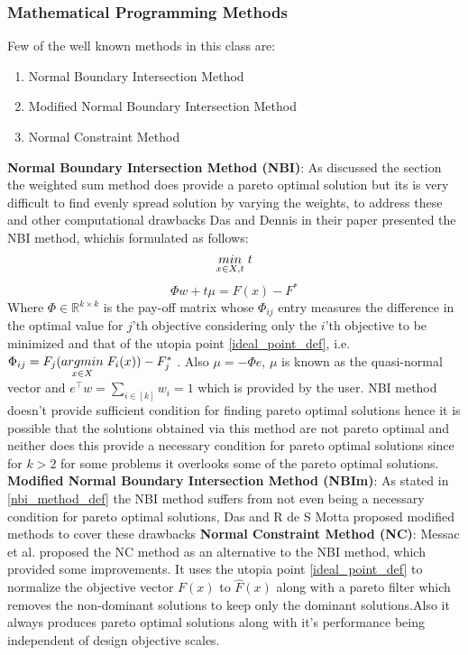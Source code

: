 \subsubsection{Mathematical Programming Methods}
Few of the well known methods in this class are:
\begin{enumerate}
    \item Normal Boundary Intersection Method
    \item Modified Normal Boundary Intersection Method
    \item Normal Constraint Method
\end{enumerate} 
\textbf{Normal Boundary Intersection Method (NBI)}: \label{nbi_method_def}
As discussed the section \label{lin_utility_model} the weighted sum method does provide a pareto optimal solution but its is very difficult to find evenly spread solution by varying the weights, to address these and other computational drawbacks Das and Dennis in their paper \cite{das1998normal} presented the NBI method, whichis formulated as follows:
\begin{equation} \label{nbi_obj}
    \underset{x\in X, t}{min} \hspace{1mm} t
\end{equation}
\begin{equation}
    \Phi w + t \mu = F(x) - F^{*}
\end{equation}
Where $\Phi \in \mathbb{R}^{k\times k}$ is the pay-off matrix whose $\Phi_{ij}$ entry measures the difference in the optimal value for $j$'th objective considering only the $i$'th objective to be minimized and that of the utopia point \ref{ideal_point_def}, i.e. $\Phi_{ij} = F_j(\underset{x\in X}{argmin}\hspace{1mm} F_i(x))-F^{*}_j$ . Also $\mu = - \Phi e$, $\mu$ is known as the quasi-normal vector and $e^{\top}w=\sum_{i\in [k]} w_i = 1$ which is provided by the user. NBI method doesn't provide sufficient condition for finding pareto optimal solutions hence it is possible that the solutions obtained via this method are not pareto optimal and neither does this provide a necessary condition for pareto optimal solutions since for $k>2$ for some problems it overlooks some of the pareto optimal solutions.
\newline\newline \textbf{Modified Normal Boundary Intersection Method (NBIm)}: \label{nbim_method_def} As stated in \ref{nbi_method_def} the NBI method suffers from not even being a necessary condition for pareto optimal solutions, Das \cite{das1999improved} and R de S Motta \cite{de2012modified} proposed modified methods to cover these drawbacks
\newline\newline \textbf{Normal Constraint Method (NC)}: \label{nc_method_def} Messac et al. \cite{messac2003normalized}\cite{messac2004normal} proposed the NC method as an alternative to the NBI method, which provided some improvements. It uses the utopia point \ref{ideal_point_def} to normalize the objective vector $F(x)$ to $\hat{F}(x)$ along with a pareto filter which removes the non-dominant solutions to keep only the dominant solutions.Also it always produces pareto optimal solutions along with it's performance being independent of design objective scales. 

